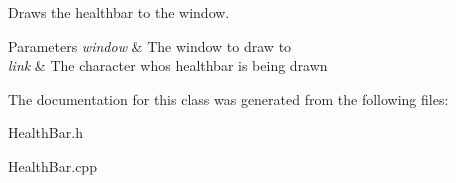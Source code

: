 Draws the healthbar to the window. 


\begin{DoxyParams}{Parameters}
{\em window} & The window to draw to\\
\hline
{\em link} & The character who\textquotesingle{}s healthbar is being drawn \\
\hline
\end{DoxyParams}


The documentation for this class was generated from the following files\+:\begin{DoxyCompactItemize}
\item 
Health\+Bar.\+h\item 
Health\+Bar.\+cpp\end{DoxyCompactItemize}
